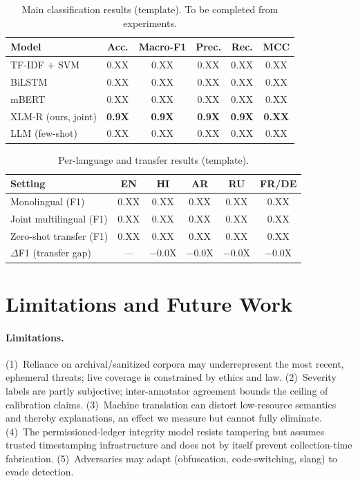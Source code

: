 \documentclass[11pt,a4paper]{article}
\begin{document}
\begin{table}[t]
\centering
\caption{Main classification results (template). To be completed from experiments.}
\label{tab:main}
\small
\begin{tabular}{@{}lccccc@{}}
\toprule
\textbf{Model} & \textbf{Acc.} & \textbf{Macro-F1} & \textbf{Prec.} & \textbf{Rec.} & \textbf{MCC} \\
\midrule
TF-IDF $+$ SVM      & 0.XX & 0.XX & 0.XX & 0.XX & 0.XX \\
BiLSTM              & 0.XX & 0.XX & 0.XX & 0.XX & 0.XX \\
mBERT               & 0.XX & 0.XX & 0.XX & 0.XX & 0.XX \\
XLM-R (ours, joint) & \textbf{0.9X} & \textbf{0.9X} & \textbf{0.9X} & \textbf{0.9X} & \textbf{0.XX} \\
LLM (few-shot)      & 0.XX & 0.XX & 0.XX & 0.XX & 0.XX \\
\bottomrule
\end{tabular}
\end{table}

\begin{table}[t]
\centering
\caption{Per-language and transfer results (template).}
\label{tab:lang}
\small
\begin{tabular}{@{}lccccc@{}}
\toprule
\textbf{Setting} & \textbf{EN} & \textbf{HI} & \textbf{AR} & \textbf{RU} & \textbf{FR/DE} \\
\midrule
Monolingual (F1)        & 0.XX & 0.XX & 0.XX & 0.XX & 0.XX \\
Joint multilingual (F1) & 0.XX & 0.XX & 0.XX & 0.XX & 0.XX \\
Zero-shot transfer (F1) & 0.XX & 0.XX & 0.XX & 0.XX & 0.XX \\
$\Delta$F1 (transfer gap) & --- & $-$0.0X & $-$0.0X & $-$0.0X & $-$0.0X \\
\bottomrule
\end{tabular}
\end{table}

\section{Limitations and Future Work}\label{sec:limits}

\paragraph{Limitations.} (1)~Reliance on archival/sanitized corpora may underrepresent
the most recent, ephemeral threats; live coverage is constrained by ethics and law.
(2)~Severity labels are partly subjective; inter-annotator agreement bounds the ceiling
of calibration claims. (3)~Machine translation can distort low-resource semantics and
thereby explanations, an effect we measure but cannot fully eliminate. (4)~The
permissioned-ledger integrity model resists tampering but assumes trusted timestamping
infrastructure and does not by itself prevent collection-time fabrication.
(5)~Adversaries may adapt (obfuscation, code-switching, slang) to evade detection.
\end{document}
